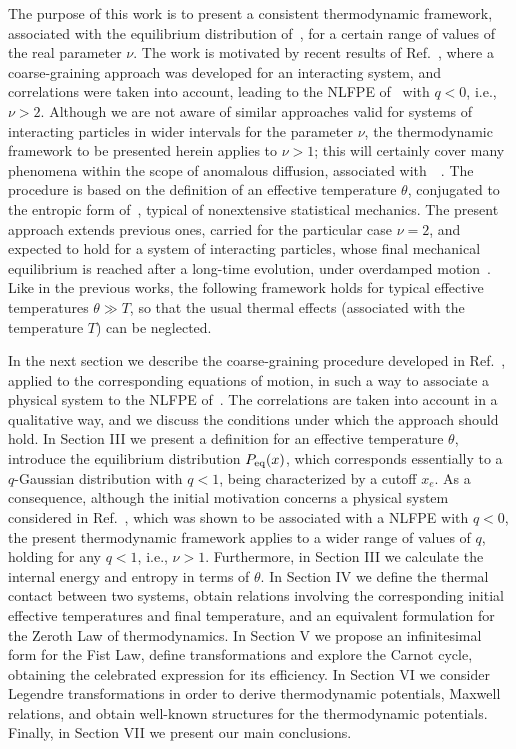 \documentclass[showpacs,preprintnumbers,amsmath,amssymb,eqsecnum]{revtex4}
\begin{document}
The purpose of this work is to present a consistent
thermodynamic framework, associated with the equilibrium
distribution of~, for a certain range of values
of the real parameter $\nu$.
The work is motivated by recent results
of Ref.~\cite{vieirapre2016}, where a coarse-graining
approach was developed for an interacting
system, and correlations were taken into account, leading to the NLFPE
of~ with $q<0$, i.e., $\nu>2$.
Although we are not aware of similar approaches valid
for systems of interacting particles in wider intervals for the parameter $\nu$,
the thermodynamic framework to be presented herein applies to $\nu>1$;
this will certainly cover many phenomena within the scope of anomalous
diffusion, associated
with~~\cite{tsallisbook,tsallisreview2011,tsallisreview2014}.
The procedure is based on the definition of an effective
temperature $\theta$, conjugated to the entropic form
of~, typical of nonextensive statistical mechanics.
The present approach extends previous
ones, carried for the particular case $\nu=2$, and
expected to hold for a system of interacting particles,
whose final mechanical equilibrium is reached after a long-time
evolution, under overdamped
motion~\cite{nobrepre2012,curadopre2014,%
randradeepl2014,nobrepre2015,ribeiropre2015,ribeiropre2016}.
Like in the previous works, the following framework holds
for typical effective temperatures $\theta \gg T$, so that
the usual thermal effects (associated with the temperature $T$)
can be neglected.

In the next section we describe
the coarse-graining procedure developed in Ref.~\cite{vieirapre2016},
applied to the corresponding equations of motion, in such a way
to associate a physical system
to the NLFPE of~.
The correlations are taken into account in a qualitative way, and
we discuss the conditions under which the approach should hold.
In Section III we present a definition for an effective temperature $\theta$,
introduce the equilibrium distribution $P_{\rm eq}(x)$, which corresponds
essentially to a $q$-Gaussian distribution with $q<1$, being
characterized by a cutoff $x_{e}$.
As a consequence, although the initial motivation concerns a
physical system considered in Ref.~\cite{vieirapre2016},
which was shown to be associated with
a NLFPE with $q<0$, the present thermodynamic framework
applies to a wider range of values of $q$, holding
for any $q<1$, i.e., $\nu>1$.
Furthermore, in Section III we calculate
the internal energy and entropy in terms of $\theta$.
In Section IV we define the thermal contact between two systems, obtain
relations involving the corresponding initial effective temperatures and
final temperature, and an equivalent formulation for the Zeroth Law of
thermodynamics.
In Section V we propose an infinitesimal form for the Fist Law, define
transformations and explore the Carnot cycle, obtaining the celebrated
expression for its efficiency.
In Section VI we consider Legendre transformations in order to
derive thermodynamic potentials, Maxwell relations, and
obtain well-known structures for the thermodynamic potentials.
Finally, in Section VII we present our main conclusions.
\end{document}
